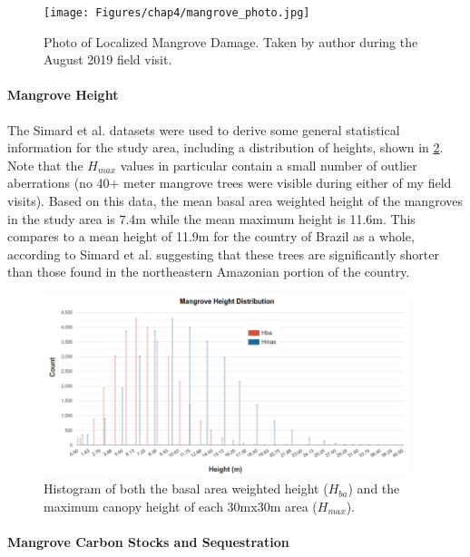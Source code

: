 \begin{figure}[!htb] 
\centering
\texttt{[image: Figures/chap4/mangrove\_photo.jpg]}
\caption[Photo of Localized Mangrove Damage]{Photo of Localized Mangrove Damage. Taken by author during the August 2019 field visit.}
\label{fig:mangrove_photo}
\end{figure}


\paragraph{Mangrove Height} \leavevmode\newline

The Simard et al. datasets were used to derive some general statistical information for the study area, including a distribution of heights, shown in \ref{fig:height_histogram}. Note that the $H_{max}$ values in particular contain a small number of outlier aberrations (no 40+ meter mangrove trees were visible during either of my field visits). Based on this data, the mean basal area weighted height of the mangroves in the study area is 7.4m while the mean maximum height is 11.6m. This compares to a mean height of 11.9m for the country of Brazil as a whole, according to Simard et al. \cite{simardMangroveCanopyHeight2019} suggesting that these trees are significantly shorter than those found in the northeastern Amazonian portion of the country.

\begin{figure}[!htb] 
\centering
\includegraphics[width=0.95\textwidth]{Figures/chap4/height_histogram.png}
\caption[Histogram of Mangrove Height in Region]{Histogram of both the basal area weighted height ($H_{ba}$) and the maximum canopy height of each 30mx30m area ($H_{max}$).}
\label{fig:height_histogram}
\end{figure}

\paragraph{Mangrove Carbon Stocks and Sequestration} \leavevmode\newline

